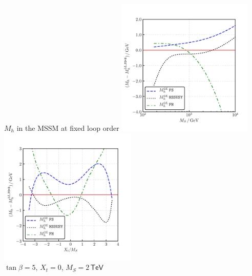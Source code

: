 \documentclass[hyperref={pdfpagelabels=false},ngerman]{beamer}
\newcommand{\eh}[1]{\,\mathsf{#1}}
\newcommand{\MS}{\ensuremath{M_S}}
\begin{document}
\begin{frame}{$M_h$ in the MSSM at fixed loop order}
  \includegraphics[width=0.49\textwidth]{plots/Mh3L/scan_Mh_MS_TB-5_Xt-0_diff}\hfill
  \includegraphics[width=0.49\textwidth]{plots/Mh3L/scan_Mh_Xt_TB-5_MS-2000_diff}\\
  $\tan\beta=5$, $X_t=0$, $\MS = 2\eh{TeV}$
\end{frame}
\end{document}
